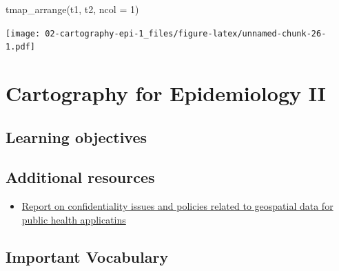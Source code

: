 \documentclass[
]{book}
\newenvironment{Shaded}{\begin{snugshade}}{\end{snugshade}}
\newcommand{\AttributeTok}[1]{\textcolor[rgb]{0.77,0.63,0.00}{#1}}
\newcommand{\DecValTok}[1]{\textcolor[rgb]{0.00,0.00,0.81}{#1}}
\newcommand{\FunctionTok}[1]{\textcolor[rgb]{0.00,0.00,0.00}{#1}}
\newcommand{\NormalTok}[1]{#1}
\providecommand{\tightlist}{%
  \setlength{\itemsep}{0pt}\setlength{\parskip}{0pt}}
\begin{document}
\begin{Shaded}
\begin{Highlighting}[]
\FunctionTok{tmap\_arrange}\NormalTok{(t1, t2, }\AttributeTok{ncol =} \DecValTok{1}\NormalTok{)}
\end{Highlighting}
\end{Shaded}

\texttt{[image: 02-cartography-epi-1\_files/figure-latex/unnamed-chunk-26-1.pdf]}

\hypertarget{cartography-for-epidemiology-ii}{%
\chapter{Cartography for Epidemiology II}\label{cartography-for-epidemiology-ii}}

\hypertarget{learning-objectives-2}{%
\section{Learning objectives}\label{learning-objectives-2}}

\hypertarget{additional-resources-2}{%
\section{Additional resources}\label{additional-resources-2}}

\begin{itemize}
\tightlist
\item
  \href{http://www.ciesin.columbia.edu/pdf/SEDAC_ConfidentialityReport.pdf}{Report on confidentiality issues and policies related to geospatial data for public health applicatins}
\end{itemize}

\hypertarget{important-vocabulary-2}{%
\section{Important Vocabulary}\label{important-vocabulary-2}}

 
  \providecommand{\huxb}[2]{\arrayrulecolor[RGB]{#1}\global\arrayrulewidth=#2pt}
  \providecommand{\huxvb}[2]{\color[RGB]{#1}\vrule width #2pt}
  \providecommand{\huxtpad}[1]{\rule{0pt}{#1}}
  \providecommand{\huxbpad}[1]{\rule[-#1]{0pt}{#1}}
\end{document}
